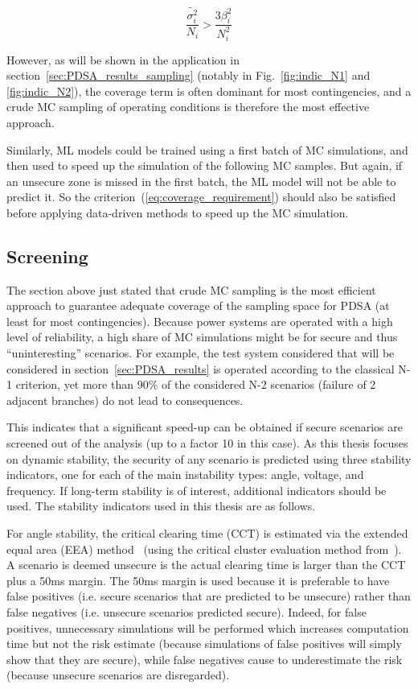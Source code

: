 \begin{equation}
  \label{eq:coverage_requirement}
  \frac{\tilde{\sigma_i^2}}{N_i} > \frac{3 \beta_i^2}{N_i^2}
\end{equation}

However, as will be shown in the application in section~\ref{sec:PDSA_results_sampling} (notably in Fig.~\ref{fig:indic_N1} and \ref{fig:indic_N2}), the coverage term is often dominant for most contingencies, and a crude MC sampling of operating conditions is therefore the most effective approach.

Similarly, ML models could be trained using a first batch of MC simulations, and then used to speed up the simulation of the following MC samples. But again, if an unsecure zone is missed in the first batch, the ML model will not be able to predict it. So the criterion~(\ref{eq:coverage_requirement}) should also be satisfied before applying data-driven methods to speed up the MC simulation.



\subsection{Screening}
\label{sec:screening}

The section above just stated that crude MC sampling is the most efficient approach to guarantee adequate coverage of the sampling space for PDSA (at least for most contingencies). Because power systems are operated with a high level of reliability, a high share of MC simulations might be for secure and thus ``uninteresting'' scenarios. For example, the test system considered that will be considered in section~\ref{sec:PDSA_results} is operated according to the classical N-1 criterion, yet more than 90\% of the considered N-2 scenarios (failure of 2 adjacent branches) do not lead to consequences.

This indicates that a significant speed-up can be obtained if secure scenarios are screened out of the analysis (up to a factor 10 in this case). As this thesis focuses on dynamic stability, the security of any scenario is predicted using three stability indicators, one for each of the main instability types: angle, voltage, and frequency. If long-term stability is of interest, additional indicators should be used. The stability indicators used in this thesis are as follows.

For angle stability, the critical clearing time (CCT) is estimated via the extended equal area (EEA) method~\cite{EqualAreaCriterionEnergies} (using the critical cluster evaluation method from~\cite{EqualAreaCriterionPSCC}). A scenario is deemed unsecure is the actual clearing time is larger than the CCT plus a 50ms margin. The 50ms margin is used because it is preferable to have false positives (i.e. secure scenarios that are predicted to be unsecure) rather than false negatives (i.e. unsecure scenarios predicted secure). Indeed, for false positives, unnecessary simulations will be performed which increases computation time but not the risk estimate (because simulations of false positives will simply show that they are secure), while false negatives cause to underestimate the risk (because unsecure scenarios are disregarded).

